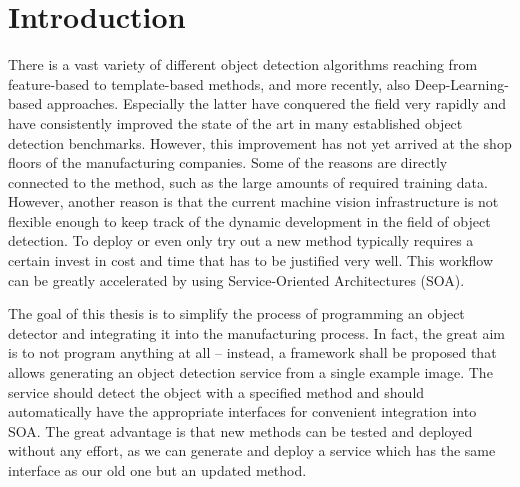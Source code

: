 \chapter{Introduction\label{cha:chapter1}}
There is a vast variety of different object detection algorithms reaching from feature-based to template-based methods, and more recently, also Deep-Learning-based approaches. Especially the latter have conquered the field very rapidly and have consistently improved the state of the art in many established object detection benchmarks. However, this improvement has not yet arrived at the shop floors of the manufacturing companies. Some of the reasons are directly connected to the method, such as the large amounts of required training data. However, another reason is that the current machine vision infrastructure is not flexible enough to keep track of the dynamic development in the field of object detection. To deploy or even only try out a new method typically requires a certain invest in cost and time that has to be justified very well. This workflow can be greatly accelerated by using Service-Oriented Architectures (SOA).

The goal of this thesis is to simplify the process of programming an object detector and integrating it into the manufacturing process. In fact, the great aim is to not program anything at all – instead, a framework shall be proposed that allows generating an object detection service from a single example image.
The service should detect the object with a specified method and should automatically have the appropriate interfaces for convenient integration into SOA. The great advantage is that new methods can be tested and deployed without any effort, as we can generate and deploy a service which has the same interface as our old one but an updated method.
 